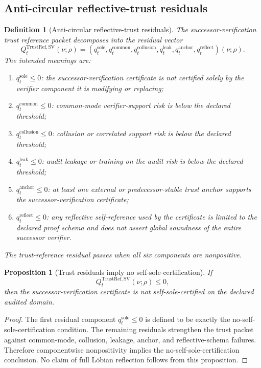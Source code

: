 \documentclass[11pt]{article}
\newtheorem{proposition}[theorem]{Proposition}
\newtheorem{definition}[theorem]{Definition}
\newcommand{\1}{\mathbf{1}}
\providecommand{\sole}{\mathrm{sole}}
\providecommand{\common}{\mathrm{common}}
\providecommand{\collusion}{\mathrm{collusion}}
\providecommand{\leak}{\mathrm{leak}}
\providecommand{\anchor}{\mathrm{anchor}}
\providecommand{\reflect}{\mathrm{reflect}}
\begin{document}
\subsection{Anti-circular reflective-trust residuals}

\begin{definition}[Anti-circular reflective-trust residuals]
\label{def:batch12a_anti_circular_trust_residuals}
The successor-verification trust reference packet decomposes into the residual vector
\[
Q_t^{\mathrm{TrustRef},\mathrm{SV}}(\nu;\rho)
=
(q_t^{\sole},q_t^{\common},q_t^{\collusion},q_t^{\leak},q_t^{\anchor},q_t^{\reflect})(\nu;\rho).
\]
The intended meanings are:
\begin{enumerate}[label=(\roman*),leftmargin=1.5em]
    \item \(q_t^{\sole}\le0\): the successor-verification certificate is not certified solely by the verifier component it is modifying or replacing;
    \item \(q_t^{\common}\le0\): common-mode verifier-support risk is below the declared threshold;
    \item \(q_t^{\collusion}\le0\): collusion or correlated support risk is below the declared threshold;
    \item \(q_t^{\leak}\le0\): audit leakage or training-on-the-audit risk is below the declared threshold;
    \item \(q_t^{\anchor}\le0\): at least one external or predecessor-stable trust anchor supports the successor-verification certificate;
    \item \(q_t^{\reflect}\le0\): any reflective self-reference used by the certificate is limited to the declared proof schema and does not assert global soundness of the entire successor verifier.
\end{enumerate}
The trust-reference residual passes when all six components are nonpositive.
\end{definition}

\begin{proposition}[Trust residuals imply no self-sole-certification]
\label{prop:batch12a_trust_residuals_no_self_sole}
If
\[
Q_t^{\mathrm{TrustRef},\mathrm{SV}}(\nu;\rho)\le0,
\]
then the successor-verification certificate is not self-sole-certified on the declared audited domain.
\end{proposition}

\begin{proof}
The first residual component \(q_t^{\sole}\le0\) is defined to be exactly the no-self-sole-certification condition.  The remaining residuals strengthen the trust packet against common-mode, collusion, leakage, anchor, and reflective-schema failures.  Therefore componentwise nonpositivity implies the no-self-sole-certification conclusion.  No claim of full L\"obian reflection follows from this proposition.
\end{proof}
\end{document}
